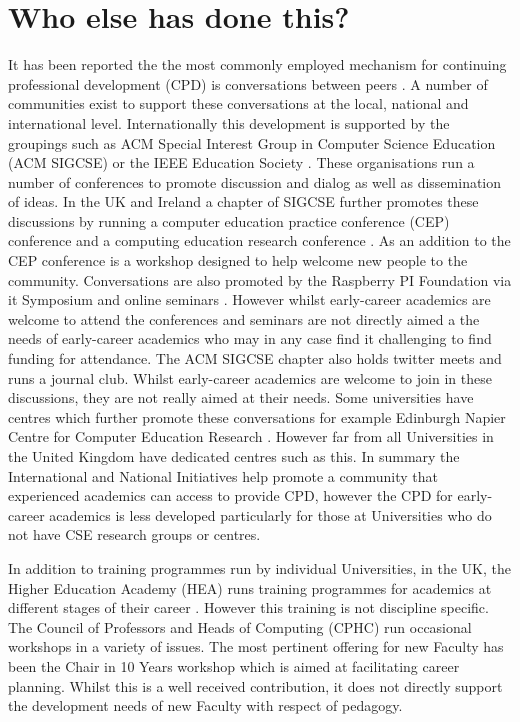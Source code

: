 \documentclass[sigconf]{acmart}
\begin{document}
\section{Who else has done this?}
It has been reported the the most commonly employed mechanism for continuing professional development (CPD) is conversations between peers \cite{King2004} . A number of communities exist to support these conversations at the local, national and international level.  Internationally this development is supported by the groupings such as ACM Special Interest Group in Computer Science Education (ACM SIGCSE) \cite{SIGCSE} or the IEEE Education Society \cite{IEEEES}.  These organisations run a number of conferences to promote discussion and dialog as well as dissemination of ideas. In the UK and Ireland a chapter of SIGCSE \cite{UKI-SIGCSE} further promotes these discussions by running a computer education practice conference (CEP) conference \cite{CEP} and a computing education research conference \cite{UKICER}. As an addition to the CEP conference is a workshop designed to help welcome new people to the community. Conversations are also promoted by the Raspberry PI Foundation via it Symposium \cite{PI_SYM} and online seminars \cite{PI_Sem}. However whilst early-career academics are welcome to attend the conferences and seminars are not directly aimed a the needs of early-career academics who may in any case find it challenging to find funding for attendance. The ACM SIGCSE chapter also holds twitter meets and runs a journal club. Whilst early-career academics are welcome to join in these discussions, they are not really aimed at their needs.  Some universities have centres which further promote these conversations for example Edinburgh Napier Centre for Computer Education Research \cite{Napier}. However far from all Universities in the United Kingdom have dedicated centres such as this. In summary the International and National Initiatives help promote a community that experienced academics can access to provide CPD, however the CPD for early-career academics is less developed particularly for those at Universities who do not have CSE research groups or centres.

In addition to training programmes run by individual Universities, in the UK, the Higher Education Academy (HEA) runs training programmes for academics at different stages of their career \cite{HEATraining}. However this training is not discipline specific. The Council of Professors and Heads of Computing (CPHC) run occasional workshops in a variety of issues. The most pertinent offering for new Faculty has been the Chair in 10 Years workshop which is aimed at facilitating career planning. Whilst this is a well received contribution, it does not directly support the development needs of new Faculty with respect of pedagogy.
\end{document}
